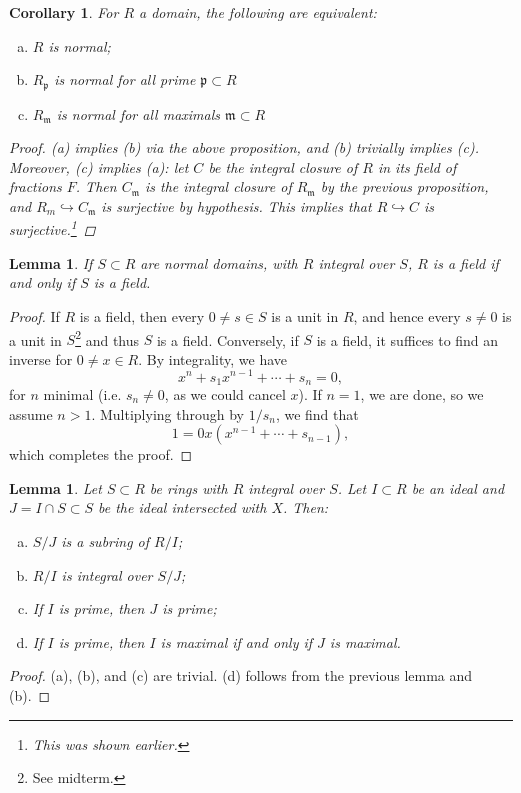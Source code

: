 \documentclass{article}
\newcommand{\fr}{\mathfrak}
\theoremstyle{plain}
\newtheorem{lem}[thm]{Lemma}
\newtheorem{cor}[thm]{Corollary}
\theoremstyle{definition}
\theoremstyle{remark}
\begin{document}
\begin{cor}
    For $R$ a domain, the following are equivalent:
    \begin{enumerate}[(a)]
        \item $R$ is normal;
        \item $R_{\fr p}$ is normal for all prime $\fr p\subset R$
        \item $R_{\fr m}$ is normal for all maximals $\fr m\subset R$
    \end{enumerate}
    \begin{proof}
        (a) implies (b) via the above proposition, and (b) trivially implies (c).
        Moreover, (c) implies (a): let $C$ be the integral closure of $R$ in its
        field of fractions $F$. Then $C_{\fr m}$ is the integral closure of $R_{\fr m}$
        by the previous proposition, and $R_m\hookrightarrow C_{\fr m}$ is surjective
        by hypothesis. This implies that $R\hookrightarrow C$ is surjective.\footnote{This was shown earlier.}
    \end{proof}
\end{cor}

\begin{lem}
    If $S\subset R$ are normal domains, with $R$ integral over $S$, $R$ is
    a field if and only if $S$ is a field.
\end{lem}
\begin{proof}
    If $R$ is a field, then every $0\neq s\in S$ is a unit in $R$, and hence
    every $s\neq 0$ is a unit in $S$\footnote{See midterm.} and thus $S$ is a field.
    Conversely, if $S$ is a field, it suffices to find an inverse for $0\neq x\in R$.
    By integrality, we have
    \[x^n+s_1x^{n-1}+\cdots+s_n=0,\]
    for $n$ minimal (i.e. $s_n\neq 0$, as we could cancel $x$). If $n=1$, we are done, so we assume $n>1$.
    Multiplying through by $1/s_n$, we find that 
    \[1=0x(x^{n-1}+\cdots+s_{n-1}),\]
    which completes the proof.
\end{proof}

\begin{lem}
    Let $S\subset R$ be rings with $R$ integral over $S$. Let $I\subset R$ be an ideal
    and $J=I\cap S\subset S$ be the ideal intersected with $X$. Then:
    \begin{enumerate}[(a)]
        \item $S/J$ is a subring of $R/I$;
        \item $R/I$ is integral over $S/J$;
        \item If $I$ is prime, then $J$ is prime;
        \item If $I$ is prime, then $I$ is maximal if and only if $J$ is maximal.
    \end{enumerate}
\end{lem}
\begin{proof}
    (a), (b), and (c) are trivial. (d) follows from the previous lemma and (b).
\end{proof}
\end{document}
